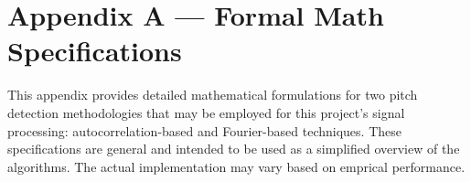 \documentclass[12pt, titlepage]{article}
\begin{document}
\newpage




\newpage{}
\section*{Appendix A --- Formal Math Specifications} \label{sec:appA}

This appendix provides detailed mathematical formulations for two pitch detection 
methodologies that may be employed for this project's signal processing: autocorrelation-based and Fourier-based techniques. These specifications are general
and intended to be used as a simplified overview of the algorithms. The actual implementation may vary based on emprical performance.
\end{document}

